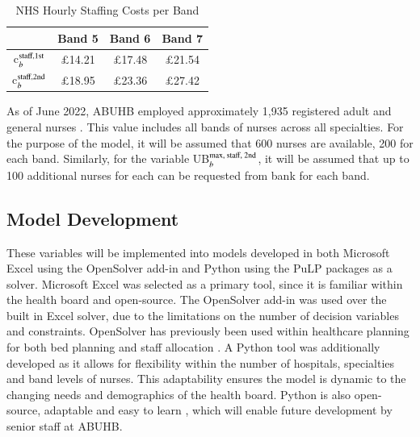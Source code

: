 \documentclass[../thesis.tex]{subfiles}
\begin{document}
\begin{table}[h!]
    \centering
    \begin{tabular}{cccc}\toprule
         & \textbf{Band 5} & \textbf{Band 6} & \textbf{Band 7} \\\midrule
       c$^{\textnormal{staff,1st}}_{b}$  & $\pounds$14.21 & $\pounds$17.48 & $\pounds$21.54 \\
         c$^{\textnormal{staff,2nd}}_{b}$ & $\pounds$18.95 & $\pounds$23.36 &  $\pounds$27.42 \\ \bottomrule
    \end{tabular}
    \caption{NHS Hourly Staffing Costs per Band}
    \label{tab:nhsbands}
\end{table}

As of June 2022, ABUHB employed approximately 1,935 registered adult and general nurses \cite{StatsWales2022}. This value includes all bands of nurses across all specialties. For the purpose of the model, it will be assumed that 600 nurses are available, 200 for each band. Similarly, for the variable UB$^\textnormal{max, staff, 2nd}_b$, it will be assumed that up to 100 additional nurses for each can be requested from bank for each band.




\subsection{Model Development}
These variables will be implemented into models developed in both Microsoft Excel using the OpenSolver add-in and Python using the PuLP packages as a solver. Microsoft Excel was selected as a primary tool, since it is familiar within the health board and open-source. The OpenSolver add-in was used over the built in Excel solver, due to the limitations  on the number of decision variables and constraints. OpenSolver has previously been used within healthcare planning for both bed planning \cite{Lal2015} and staff allocation \cite{Respicio2018}. A Python tool was additionally developed as it allows for flexibility within the number of hospitals, specialties and band levels of nurses. This adaptability ensures the model is dynamic to the changing needs and demographics of the health board. Python is also open-source, adaptable and easy to learn \cite{Ranum2006}, which will enable future development by senior staff at ABUHB. 
\end{document}
